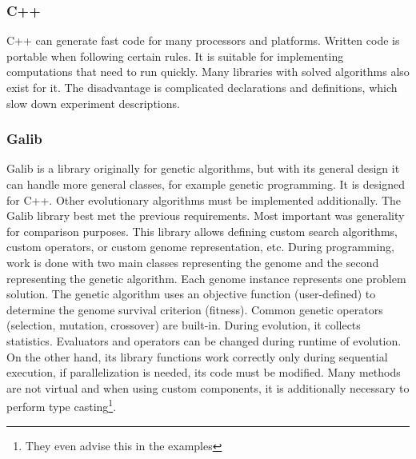 \subsubsection{C++}
C++ can generate fast code for many processors and platforms. Written code is
portable when following certain rules. It is suitable for implementing computations that
need to run quickly. Many libraries with solved algorithms also exist for it.
The disadvantage is complicated declarations and definitions, which slow down experiment descriptions. %

\pagebreak

\subsubsection{Galib}
Galib is a library originally for genetic algorithms, but with its general design it can handle more general classes,
for example genetic programming. It is designed for C++. Other evolutionary algorithms must be implemented additionally.
The Galib library best met the previous requirements. Most important was generality for comparison purposes.
This library \cite{galib} allows defining custom search algorithms, custom operators, or
custom genome representation, etc. During programming, work is done with two main classes
representing the genome and the second representing the genetic algorithm.
Each genome instance represents one problem solution.
The genetic algorithm uses an objective function (user-defined)
to determine the genome survival criterion (fitness). Common genetic operators (selection, mutation, crossover)
are built-in. During evolution, it collects statistics. Evaluators and operators can be changed during runtime
of evolution.
On the other hand, its library functions work correctly only during sequential execution,
if parallelization is needed, its code must be modified. Many methods are not virtual
and when using custom components, it is additionally necessary
to perform type casting\footnote{They even advise this in the examples}.

